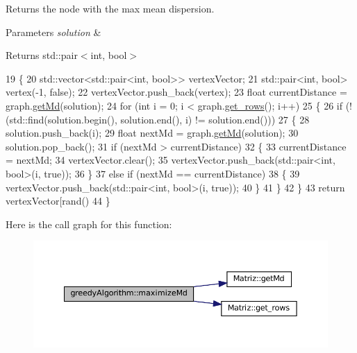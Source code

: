 Returns the node with the max mean dispersion. 


\begin{DoxyParams}{Parameters}
{\em solution} & \\
\hline
\end{DoxyParams}
\begin{DoxyReturn}{Returns}
std\+::pair$<$int, bool$>$ 
\end{DoxyReturn}

\begin{DoxyCode}
19 \{
20   std::vector<std::pair<int, bool>> vertexVector;
21   std::pair<int, bool> vertex(-1, \textcolor{keyword}{false});
22   vertexVector.push\_back(vertex);
23   \textcolor{keywordtype}{float} currentDistance = graph.\hyperlink{classMatriz_a8df14a27d791f24206dd633b2a685c5b}{getMd}(solution);
24   \textcolor{keywordflow}{for} (\textcolor{keywordtype}{int} i = 0; i < graph.\hyperlink{classMatriz_a6b18342f8c083baece693ff41185a206}{get\_rows}(); i++)
25   \{
26     \textcolor{keywordflow}{if} (!(std::find(solution.begin(), solution.end(), i) != solution.end()))
27     \{
28       solution.push\_back(i);
29       \textcolor{keywordtype}{float} nextMd = graph.\hyperlink{classMatriz_a8df14a27d791f24206dd633b2a685c5b}{getMd}(solution);
30       solution.pop\_back();
31       \textcolor{keywordflow}{if} (nextMd > currentDistance)
32       \{
33         currentDistance = nextMd;
34         vertexVector.clear();
35         vertexVector.push\_back(std::pair<int, bool>(i, \textcolor{keyword}{true}));
36       \}
37       \textcolor{keywordflow}{else} \textcolor{keywordflow}{if} (nextMd == currentDistance)
38       \{
39         vertexVector.push\_back(std::pair<int, bool>(i, \textcolor{keyword}{true}));
40       \}
41     \}
42   \}
43   \textcolor{keywordflow}{return} vertexVector[rand() %
44 \}
\end{DoxyCode}
Here is the call graph for this function\+:
\nopagebreak
\begin{figure}[H]
\begin{center}
\leavevmode
\includegraphics[width=350pt]{classgreedyAlgorithm_a4968e1371d2fdfb1b1b6f24b57dd1f07_cgraph}
\end{center}
\end{figure}

